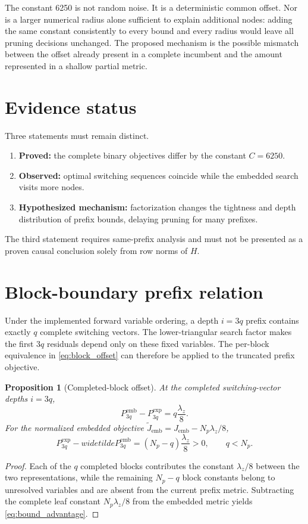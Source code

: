 \documentclass[paper=a4,oneside,fontsize=12pt,DIV=14,headings=normal,parskip=half,headsepline,numbers=noendperiod]{scrreprt}
\newtheorem{proposition}{Proposition}[chapter]
\begin{document}
The constant 6250 is not random noise.  It is a deterministic common offset.
Nor is a larger numerical radius alone sufficient to explain additional
nodes: adding the same constant consistently to every bound and every radius
would leave all pruning decisions unchanged.  The proposed mechanism is the
possible mismatch between the offset already present in a complete incumbent
and the amount represented in a shallow partial metric.

\section{Evidence status}
Three statements must remain distinct.
\begin{enumerate}
 \item \textbf{Proved:} the complete binary objectives differ by the constant
 $C=6250$.
 \item \textbf{Observed:} optimal switching sequences coincide while the
 embedded search visits more nodes.
 \item \textbf{Hypothesized mechanism:} factorization changes the tightness
 and depth distribution of prefix bounds, delaying pruning for many prefixes.
\end{enumerate}
The third statement requires same-prefix analysis and must not be presented as
a proven causal conclusion solely from row norms of $H$.

\section{Block-boundary prefix relation}
Under the implemented forward variable ordering, a depth $i=3q$ prefix
contains exactly $q$ complete switching vectors.  The lower-triangular search
factor makes the first $3q$ residuals depend only on these fixed variables.
The per-block equivalence in \cref{eq:block_offset} can therefore be applied to
the truncated prefix objective.

\begin{proposition}[Completed-block offset]
At the completed switching-vector depths $i=3q$,
\begin{equation}
 P_{3q}^{\mathrm{emb}}-P_{3q}^{\mathrm{exp}}
 =q\frac{\lambda_z}{8}.
 \label{eq:block_prefix_offset}
\end{equation}
For the normalized embedded objective
$\widetilde J_{\mathrm{emb}}=J_{\mathrm{emb}}-N_p\lambda_z/8$,
\begin{equation}
 P_{3q}^{\mathrm{exp}}-widetilde P_{3q}^{\mathrm{emb}}
 =(N_p-q)\frac{\lambda_z}{8}>0,
 \qquad q<N_p.
 \label{eq:bound_advantage}
\end{equation}
\end{proposition}
\begin{proof}
Each of the $q$ completed blocks contributes the constant $\lambda_z/8$
between the two representations, while the remaining $N_p-q$ block constants
belong to unresolved variables and are absent from the current prefix metric.
Subtracting the complete leaf constant $N_p\lambda_z/8$ from the embedded
metric yields \cref{eq:bound_advantage}.
\end{proof}
\end{document}
